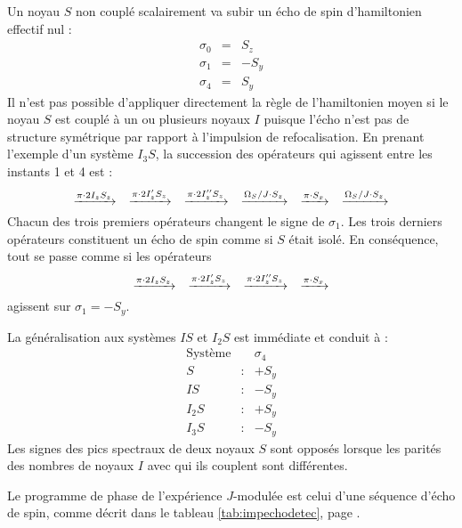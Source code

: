 Un noyau $S$ non couplé scalairement va subir un écho de spin d'hamiltonien effectif nul :
\begin{eqnarray}
\sigma_0 & = & S_z \\
\sigma_1 & = & -S_y \\
\sigma_4 & = & S_y
\end{eqnarray}
Il n'est pas possible d'appliquer directement la règle de l'hamiltonien moyen
si le noyau $S$ est couplé à un ou plusieurs noyaux $I$ puisque l'écho
n'est pas de structure symétrique par rapport à l'impulsion de refocalisation.
En prenant l'exemple d'un système $I_3S$, la succession des opérateurs qui
agissent entre les instants 1 et 4 est :
\begin{equation}
\xrightarrow{\pi \cdot 2I_zS_z} \quad \xrightarrow{\pi \cdot 2I'_zS_z} 
\quad \xrightarrow{\pi \cdot 2I''_zS_z} 
\quad \xrightarrow{\Omega_S/J \cdot S_z} \quad \xrightarrow{\pi \cdot S_x} 
\quad \xrightarrow{\Omega_S/J \cdot S_z}
\end{equation}
Chacun des trois premiers opérateurs changent le signe de $\sigma_1$.
Les trois derniers opérateurs constituent un écho de spin comme si $S$ était isolé.
En conséquence, tout se passe comme si les opérateurs
\begin{equation}
\xrightarrow{\pi \cdot 2I_zS_z} \quad \xrightarrow{\pi \cdot 2I'_zS_z} \quad \xrightarrow{\pi \cdot 2I''_zS_z} 
\quad \xrightarrow{\pi \cdot S_x}
\end{equation}
agissent sur $\sigma_1 = -S_y$.

La généralisation aux systèmes $IS$ et $I_2S$ est immédiate et conduit à :
\begin{eqnarray}
\mbox{Système} & & \sigma_4 \nonumber\\
S & : & + S_y \\
IS & : & - S_y \\
I_2S & : & + S_y \\
I_3S & : & - S_y
\end{eqnarray}
Les signes des pics spectraux de deux noyaux $S$ sont opposés lorsque les parités des nombres
de noyaux $I$ avec qui ils couplent sont différentes.

Le programme de phase de l'expérience $J$-modulée est celui d'une séquence
d'écho de spin, comme décrit dans le tableau 
\ref{tab:impechodetec}, page \pageref{tab:impechodetec}.


